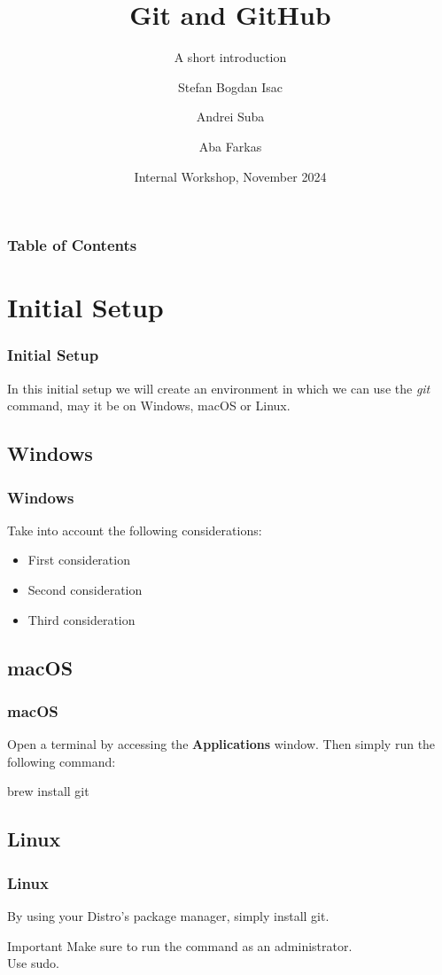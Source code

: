 \documentclass{beamer}
\title{Git and GitHub}
\subtitle{A short introduction}
\author{Stefan Bogdan Isac \and Andrei Suba \and Aba Farkas}
\date[WS 2024]
{Internal Workshop, November 2024}
\begin{document}
\frame{\titlepage}

\begin{frame}
\frametitle{Table of Contents}
\tableofcontents
\end{frame}

\section{Initial Setup}
\begin{frame}
\frametitle{Initial Setup}

In this initial setup we will create an environment in which
we can use the \textit{git} command, may it be on
Windows, macOS or Linux.
\end{frame}

\subsection{Windows}
\begin{frame}
\frametitle{Windows}

Take into account the following considerations:
\begin{itemize}
  \item First consideration
  \item Second consideration
  \item Third consideration
\end{itemize}
  
\end{frame}

\subsection{macOS}
\begin{frame}
\frametitle{macOS}

  Open a terminal by accessing the \textbf{Applications} window.
  Then simply run the following command:
  \begin{examples}
    brew install git
  \end{examples}
  
\end{frame}

\subsection{Linux}
\begin{frame}
\frametitle{Linux}

By using your Distro's package manager, simply install git.
  \begin{alertblock}{Important}
    Make sure to run the command as an administrator.\\
    Use \alert{sudo}.
  \end{alertblock}
  
\end{frame}
\end{document}
